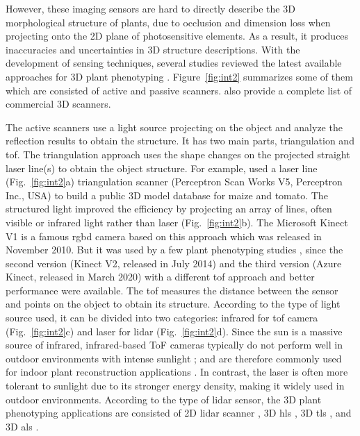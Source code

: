 However, these imaging sensors are hard to directly describe the 3D morphological structure of plants, due to occlusion and dimension loss when projecting onto the 2D plane of photosensitive elements. As a result, it produces inaccuracies and uncertainties in 3D structure descriptions. With the development of sensing techniques, several studies reviewed the latest available approaches for 3D plant phenotyping \citep{paulus_measuring_2019, okura_3d_2022, kochi_introduction_2021}. Figure~\ref{fig:int2} summarizes some of them which are consisted of active and passive scanners. \citet[Table 5]{bartol_review_2021} also provide a complete list of commercial 3D scanners.



The active scanners use a light source projecting on the object and analyze the reflection results to obtain the structure. It has two main parts, triangulation and \gls{tof}. The triangulation approach uses the shape changes on the projected straight laser line(s) to obtain the object structure. For example, \citet[Figure~3]{schunck_pheno4d_2021} used a laser line (Fig.~\ref{fig:int2}a) triangulation scanner (Perceptron Scan Works V5, Perceptron Inc., USA) to build a public 3D model database for maize and tomato. The structured light improved the efficiency by projecting an array of lines, often visible or infrared light rather than laser (Fig.~\ref{fig:int2}b). The Microsoft Kinect V1 is a famous \gls{rgbd} camera based on this approach which was released in November 2010. But it was used by a few plant phenotyping studies \citep{nguyen_structured_2015}, since the second version (Kinect V2, released in July 2014) and the third version (Azure Kinect, released in March 2020) with a different \gls{tof} approach and better performance \citep{tolgyessy_evaluation_2021, lachat_assessment_2015} were available. The \acrfull{tof} measures the distance between the sensor and points on the object to obtain its structure. According to the type of light source used, it can be divided into two categories: infrared for \gls{tof} camera (Fig.~\ref{fig:int2}c) and laser for \gls{lidar} (Fig.~\ref{fig:int2}d). Since the sun is a massive source of infrared, infrared-based ToF cameras typically do not perform well in outdoor environments with intense sunlight \citep{tolgyessy_evaluation_2021}; and are therefore commonly used for indoor plant reconstruction applications \citep{martinez_low_2019, zhang_3d_2020, xu_global_2023}. In contrast, the laser is often more tolerant to sunlight due to its stronger energy density, making it widely used in outdoor environments. According to the type of \gls{lidar} sensor, the 3D plant phenotyping applications are consisted of 2D \gls{lidar} scanner \citep{garrido_3d_2015}, 3D \gls{hls} \citep{ma_calculation_2019}, 3D \gls{tls} \citep{wu_accurate_2019, su_estimation_2018, qiu_field-based_2019}, and 3D \gls{als} \citep{ten_biomass_2019, nguyen_uav_2023}.

